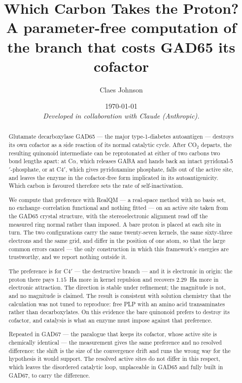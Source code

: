 \documentclass[11pt]{article}
\title{\textbf{Which Carbon Takes the Proton?}\\[0.3em]
\large A parameter-free computation of the branch that costs GAD65 its cofactor}
\author[1]{Claes Johnson}
\affil[1]{KTH Royal Institute of Technology, Stockholm, Sweden \\ \texttt{claesjohnson@gmail.com}}
\date{\today \\[0.4em]\small\textit{Developed in collaboration with Claude (Anthropic).}}
\newcommand{\Ca}{C\ensuremath{\alpha}}
\newcommand{\Cfp}{C4\ensuremath{'}}
\begin{document}
\maketitle

\begin{abstract}
\noindent Glutamate decarboxylase GAD65 --- the major type-1-diabetes autoantigen --- destroys its
own cofactor as a side reaction of its normal catalytic cycle. After CO$_2$ departs, the resulting
quinonoid intermediate can be reprotonated at either of two carbons two bond lengths apart: at
\Ca{}, which releases GABA and hands back an intact pyridoxal-5$'$-phosphate, or at \Cfp{}, which
gives pyridoxamine phosphate, falls out of the active site, and leaves the enzyme in the
cofactor-free form implicated in its autoantigenicity. Which carbon is favoured therefore sets the
rate of self-inactivation.

We compute that preference with RealQM --- a real-space method with no basis set, no
exchange--correlation functional and nothing fitted --- on an active site taken from the GAD65
crystal structure, with the stereoelectronic alignment read off the measured ring normal rather than
imposed. A bare proton is placed at each site in turn. The two configurations carry the same
twenty-seven kernels, the same sixty-three electrons and the same grid, and differ in the position of
one atom, so that the large common errors cancel --- the only construction in which this framework's
energies are trustworthy, and we report nothing outside it.

The preference is for \Cfp{} --- the destructive branch --- and it is electronic in origin: the
proton there pays $1.15$~Ha more in kernel repulsion and recovers $2.29$~Ha more in electronic
attraction. The direction is stable under refinement; the magnitude is not, and no magnitude is
claimed. The result is consistent with solution chemistry that the calculation was not tuned to
reproduce: free PLP with an amino acid transaminates rather than decarboxylates. On this evidence
the bare quinonoid prefers to destroy its cofactor, and catalysis is what an enzyme must impose
against that preference.

Repeated in GAD67 --- the paralogue that keeps its cofactor, whose active site is chemically
identical --- the measurement gives the same preference and no resolved difference: the shift is the
size of the convergence drift and runs the wrong way for the hypothesis it would support. The
resolved active sites do not differ in this respect, which leaves the disordered catalytic loop,
unplaceable in GAD65 and fully built in GAD67, to carry the difference.
\end{abstract}
\end{document}
